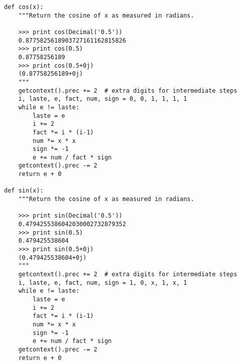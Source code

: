 \begin{verbatim}
def cos(x):
    """Return the cosine of x as measured in radians.

    >>> print cos(Decimal('0.5'))
    0.8775825618903727161162815826
    >>> print cos(0.5)
    0.87758256189
    >>> print cos(0.5+0j)
    (0.87758256189+0j)
    """
    getcontext().prec += 2  # extra digits for intermediate steps
    i, laste, e, fact, num, sign = 0, 0, 1, 1, 1, 1
    while e != laste:
        laste = e    
        i += 2
        fact *= i * (i-1)
        num *= x * x
        sign *= -1
        e += num / fact * sign 
    getcontext().prec -= 2        
    return e + 0

def sin(x):
    """Return the cosine of x as measured in radians.

    >>> print sin(Decimal('0.5'))
    0.4794255386042030002732879352
    >>> print sin(0.5)
    0.479425538604
    >>> print sin(0.5+0j)
    (0.479425538604+0j)
    """
    getcontext().prec += 2  # extra digits for intermediate steps
    i, laste, e, fact, num, sign = 1, 0, x, 1, x, 1
    while e != laste:
        laste = e    
        i += 2
        fact *= i * (i-1)
        num *= x * x
        sign *= -1
        e += num / fact * sign 
    getcontext().prec -= 2        
    return e + 0

\end{verbatim}                                             
